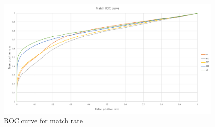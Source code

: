 

\begin{figure}[ht!]
\centering
\includegraphics[width=1.0\columnwidth]{4_experiments/roc}
\caption{ROC curve for match rate}
\label{fig:markerless_roc}
\end{figure}





